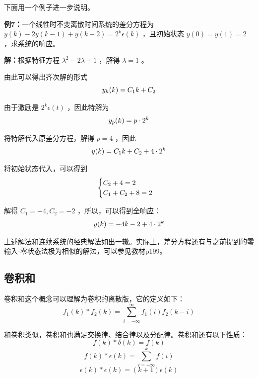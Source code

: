 \documentclass[UTF8,a4paper,11pt]{article}
\begin{document}
下面用一个例子进一步说明。

\textbf{例7：}一个线性时不变离散时间系统的差分方程为 $y(k)-2y(k-1)+y(k-2)=2^k\epsilon(k)$ ，且初始状态 $y(0)=y(1)=2$ ，求系统的响应。

\textbf{解：}根据特征方程 $\lambda^2-2\lambda+1$ ，解得 $\lambda=1$ 。

由此可以得出齐次解的形式
\begin{equation}
y_h(k)=C_1k+C_2
\notag
\end{equation}

由于激励是 $2^k\epsilon(t)$  ，因此特解为
\begin{equation}
y_p(k)=p\cdot 2^k
\notag
\end{equation}

将特解代入原差分方程，解得 $p=4$ ，因此
\begin{equation}
y(k)=C_1k+C_2+4\cdot 2^k
\notag
\end{equation}

将初始状态代入，可以得到
\begin{equation}
\begin{cases}
C_2+4=2 \\
C_1+C_2+8=2 \\
\end{cases}
\notag
\end{equation}

解得 $C_1=-4, C_2=-2$ ，所以，可以得到全响应：
\begin{equation}
y(k)=-4k-2+4\cdot 2^k
\notag
\end{equation}

上述解法和连续系统的经典解法如出一辙。实际上，差分方程还有与之前提到的零输入-零状态法极为相似的解法，可以参见教材p199。

\subsection{卷积和}
卷积和这个概念可以理解为卷积的离散版，它的定义如下：
\begin{equation}
f_1(k)*f_2(k)=\sum_{i=-\infty}^{\infty} f_1(i)f_2(k-i)
\end{equation}

和卷积类似，卷积和也满足交换律、结合律以及分配律。卷积和还有以下性质：
\begin{equation}
f(k)*\delta(k)=f(k)
\end{equation}
\begin{equation}
f(k)*\epsilon(k)=\sum_{i=-\infty}^k f(i)
\end{equation}
\begin{equation}
\epsilon(k)*\epsilon(k)=(k+1)\epsilon(k)
\end{equation}
\end{document}
